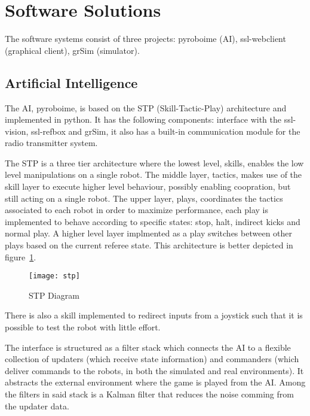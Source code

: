 \section{Software Solutions}\label{soft_sys_sec}

The software systems consist of three projects: pyroboime (AI), ssl-webclient
(graphical client), grSim (simulator).

\subsection{Artificial Intelligence}

The AI, pyroboime, is based on the STP (Skill-Tactic-Play) architecture and
implemented in python.
It has the following components: interface with the ssl-vision, ssl-refbox and
grSim, it also has a built-in communication module for the radio transmitter
system.

The STP is a three tier architecture where the lowest level, skills, enables
the low level manipulations on a single robot.
The middle layer, tactics, makes use of the skill layer to execute higher level
behaviour, possibly enabling coopration, but still acting on a single robot.
The upper layer, plays, coordinates the tactics associated to each robot in
order to maximize performance, each play is implemented to behave according to
specific states: stop, halt, indirect kicks and normal play.
A higher level layer implmented as a play switches between other plays based on
the current referee state.
This architecture is better depicted in figure~\ref{fig:stp}.

\begin{figure}[H]
     \centering
     \texttt{[image: stp]}
     \caption{STP Diagram}
     \label{fig:stp}
\end{figure}

There is also a skill implemented to redirect inputs from a joystick such that
it is possible to test the robot with little effort.

The interface is structured as a filter stack which connects the AI to a
flexible collection of updaters (which receive state information) and
commanders (which deliver commands to the robots, in both the simulated and
real environments).
It abstracts the external environment where the game is played from the AI\@.
Among the filters in said stack is a Kalman filter that reduces the noise
comming from the updater data.

